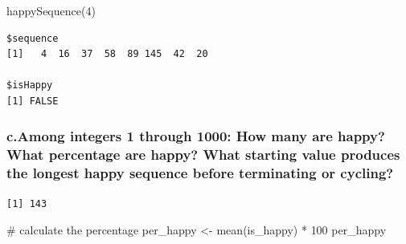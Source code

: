 \documentclass[
  letterpaper,
  DIV=11,
  numbers=noendperiod]{scrartcl}
\newenvironment{Shaded}{\begin{snugshade}}{\end{snugshade}}
\newcommand{\CommentTok}[1]{\textcolor[rgb]{0.37,0.37,0.37}{#1}}
\newcommand{\ControlFlowTok}[1]{\textcolor[rgb]{0.00,0.23,0.31}{\textbf{#1}}}
\newcommand{\DecValTok}[1]{\textcolor[rgb]{0.68,0.00,0.00}{#1}}
\newcommand{\FunctionTok}[1]{\textcolor[rgb]{0.28,0.35,0.67}{#1}}
\newcommand{\NormalTok}[1]{\textcolor[rgb]{0.00,0.23,0.31}{#1}}
\newcommand{\OtherTok}[1]{\textcolor[rgb]{0.00,0.23,0.31}{#1}}
\newcommand{\SpecialCharTok}[1]{\textcolor[rgb]{0.37,0.37,0.37}{#1}}
\begin{document}
\begin{Shaded}
\begin{Highlighting}[]
\FunctionTok{happySequence}\NormalTok{(}\DecValTok{4}\NormalTok{)}
\end{Highlighting}
\end{Shaded}

\begin{verbatim}
$sequence
[1]   4  16  37  58  89 145  42  20

$isHappy
[1] FALSE
\end{verbatim}

\subsubsection{c.Among integers 1 through 1000: How many are happy? What
percentage are happy? What starting value produces the longest happy
sequence before terminating or
cycling?}\label{c.among-integers-1-through-1000-how-many-are-happy-what-percentage-are-happy-what-starting-value-produces-the-longest-happy-sequence-before-terminating-or-cycling}

\begin{Shaded}
\end{Shaded}

\begin{verbatim}
[1] 143
\end{verbatim}

\begin{Shaded}
\begin{Highlighting}[]
\CommentTok{\# calculate the percentage}
\NormalTok{per\_happy }\OtherTok{\textless{}{-}} \FunctionTok{mean}\NormalTok{(is\_happy) }\SpecialCharTok{*} \DecValTok{100}
\NormalTok{per\_happy}
\end{Highlighting}
\end{Shaded}
\end{document}
